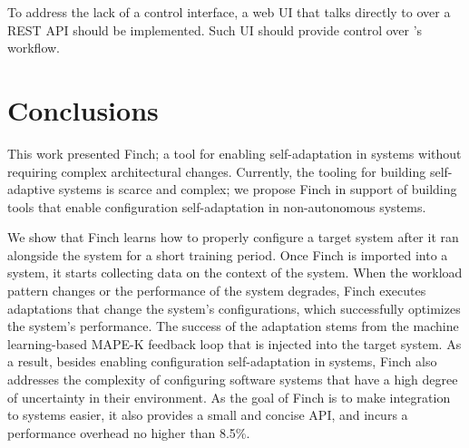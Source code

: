 To address the lack of a control interface, a web UI that talks directly to \projectname{} over a REST API should be implemented. Such UI should provide control over \projectname{} 's workflow.


\section{Conclusions}

This work presented Finch; a tool for enabling self-adaptation in systems without requiring complex architectural changes. Currently, the tooling for building self-adaptive systems is scarce and complex; we propose Finch in support of building tools that enable configuration self-adaptation in non-autonomous systems.

We show that Finch learns how to properly configure a target system after it ran alongside the system for a short training period. Once Finch is imported into a system, it starts collecting data on the context of the system. When the workload pattern changes or the performance of the system degrades, Finch executes adaptations that change the system’s configurations, which successfully optimizes the system's performance. The success of the adaptation stems from the machine learning-based MAPE-K feedback loop that is injected into the target system. As a result, besides enabling configuration self-adaptation in systems, Finch also addresses the complexity of configuring software systems that have a high degree of uncertainty in their environment.
As the goal of Finch is to make integration to systems easier, it also provides a small and concise API, and incurs a performance overhead no higher than 8.5\%. 





